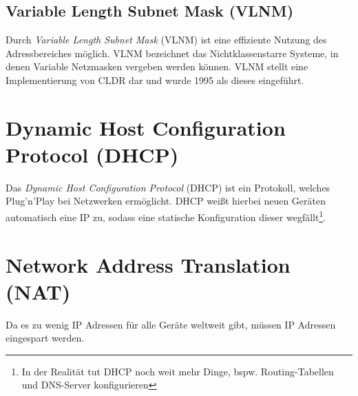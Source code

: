         \subsection{Variable Length Subnet Mask (VLNM)}
            Durch \textit{Variable Length Subnet Mask} (VLNM) ist eine effiziente Nutzung des Adressbereiches möglich. VLNM bezeichnet das Nichtklassenstarre Systeme, in denen Variable Netzmasken vergeben werden können. VLNM stellt eine Implementierung von CLDR dar und wurde 1995 als dieses eingeführt.

    \section{Dynamic Host Configuration Protocol (DHCP)} %
        Das \textit{Dynamic Host Configuration Protocol} (DHCP) ist ein Protokoll, welches Plug'n'Play bei Netzwerken ermöglicht. DHCP weißt hierbei neuen Geräten automatisch eine IP zu, sodass eine statische Konfiguration dieser wegfällt\footnote{In der Realität tut DHCP noch weit mehr Dinge, bspw. Routing-Tabellen und DNS-Server konfigurieren}.

    \section{Network Address Translation (NAT)}
        Da es zu wenig IP Adressen für alle Geräte weltweit gibt, müssen IP Adressen eingespart werden.
        
